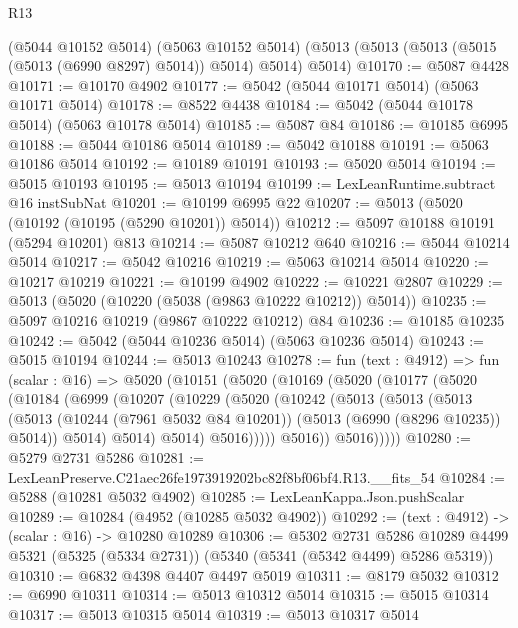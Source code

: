 \begin{lexlean}{R13}
\begin{coremodule}
    (@5044 @10152 @5014)
    (@5063 @10152 @5014)
    (@5013 (@5013 (@5013 (@5015 (@5013 (@6990 @8297) @5014)) @5014) @5014) @5014)
@10170 := @5087 @4428
@10171 := @10170 @4902
@10177 := @5042 (@5044 @10171 @5014) (@5063 @10171 @5014)
@10178 := @8522 @4438
@10184 := @5042 (@5044 @10178 @5014) (@5063 @10178 @5014)
@10185 := @5087 @84
@10186 := @10185 @6995
@10188 := @5044 @10186 @5014
@10189 := @5042 @10188
@10191 := @5063 @10186 @5014
@10192 := @10189 @10191
@10193 := @5020 @5014
@10194 := @5015 @10193
@10195 := @5013 @10194
@10199 := LexLeanRuntime.subtract @16 instSubNat
@10201 := @10199 @6995 @22
@10207 := @5013 (@5020 (@10192 (@10195 (@5290 @10201)) @5014))
@10212 := @5097 @10188 @10191 (@5294 @10201) @813
@10214 := @5087 @10212 @640
@10216 := @5044 @10214 @5014
@10217 := @5042 @10216
@10219 := @5063 @10214 @5014
@10220 := @10217 @10219
@10221 := @10199 @4902
@10222 := @10221 @2807
@10229 := @5013 (@5020 (@10220 (@5038 (@9863 @10222 @10212)) @5014))
@10235 := @5097 @10216 @10219 (@9867 @10222 @10212) @84
@10236 := @10185 @10235
@10242 := @5042 (@5044 @10236 @5014) (@5063 @10236 @5014)
@10243 := @5015 @10194
@10244 := @5013 @10243
@10278 := fun (text : @4912) =>
  fun (scalar : @16) =>
  @5020
    (@10151
      (@5020
        (@10169
          (@5020
            (@10177
              (@5020
                (@10184
                  (@6999
                    (@10207
                      (@10229
                        (@5020
                          (@10242
                            (@5013
                              (@5013
                                (@5013
                                  (@5013
                                    (@10244 (@7961 @5032 @84 @10201))
                                    (@5013 (@6990 (@8296 @10235)) @5014))
                                  @5014)
                                @5014)
                              @5014)
                            @5016)))))
                  @5016))
              @5016)))))
@10280 := @5279 @2731 @5286
@10281 := LexLeanPreserve.C21aec26fe1973919202bc82f8bf06bf4.R13.__fits_54
@10284 := @5288 (@10281 @5032 @4902)
@10285 := LexLeanKappa.Json.pushScalar
@10289 := @10284 (@4952 (@10285 @5032 @4902))
@10292 := (text : @4912) -> (scalar : @16) -> @10280 @10289
@10306 := @5302
    @2731
    @5286
    @10289
    @4499
    @5321
    (@5325 (@5334 @2731))
    (@5340 (@5341 (@5342 @4499) @5286 @5319))
@10310 := @6832 @4398 @4407 @4497 @5019
@10311 := @8179 @5032
@10312 := @6990 @10311
@10314 := @5013 @10312 @5014
@10315 := @5015 @10314
@10317 := @5013 @10315 @5014
@10319 := @5013 @10317 @5014

\end{coremodule}
\end{lexlean}
